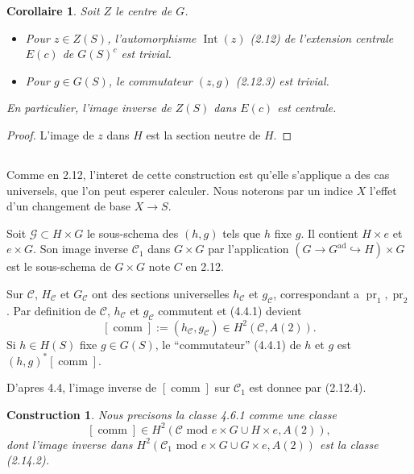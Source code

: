\documentclass[11pt,a4paper]{article}
\theoremstyle{plain}
\newtheorem{corollary}[theorem]{Corollaire}
\newtheorem{construction}[theorem]{Construction}
\theoremstyle{definition}
\DeclareMathOperator{\ad}{ad}
\DeclareMathOperator{\Int}{Int}
\DeclareMathOperator{\pr}{pr}
\DeclareMathOperator{\comm}{comm}
\begin{document}
\begin{corollary}\label{4.5}
Soit $Z$ le centre de $G$.
\begin{itemize}
\item[(i)] Pour $z \in Z(S)$, l'automorphisme $\Int(z)$ (2.12) de l'extension centrale $E(c)$ de $G(S)^c$ est trivial.
\item[(ii)] Pour $g \in G(S)$, le commutateur $(z, g)$ (2.12.3) est trivial.
\end{itemize}
En particulier, l'image inverse de $Z(S)$ dans $E(c)$ est centrale.
\end{corollary}

\begin{proof}
L'image de $z$ dans $H$ est la section neutre de $H$.
\end{proof}

\subsection{}\label{4.6}

Comme en 2.12, l'interet de cette construction est qu'elle s'applique a des cas universels, que l'on peut esperer calculer. Nous noterons par un indice $X$ l'effet d'un changement de base $X \to S$.

Soit $\mathscr{G} \subset H \times G$ le sous-schema des $(h, g)$ tels que $h$ fixe $g$. Il contient $H \times e$ et $e \times G$. Son image inverse $\mathscr{C}_1$ dans $G \times G$ par l'application $(G \to G^{\ad} \hookrightarrow H) \times G$ est le sous-schema de $G \times G$ note $C$ en 2.12.

Sur $\mathscr{C}$, $H_{\mathscr{C}}$ et $G_{\mathscr{C}}$ ont des sections universelles $h_{\mathscr{C}}$ et $g_{\mathscr{C}}$, correspondant a $\pr_1, \pr_2$. Par definition de $\mathscr{C}$, $h_{\mathscr{C}}$ et $g_{\mathscr{C}}$ commutent et (4.4.1) devient
\begin{equation}\label{4.6.1}
[\comm] := (h_{\mathscr{C}}, g_{\mathscr{C}}) \in H^2(\mathscr{C}, A(2)).
\end{equation}
Si $h \in H(S)$ fixe $g \in G(S)$, le ``commutateur'' (4.4.1) de $h$ et $g$ est $(h, g)^*[\comm]$.

D'apres 4.4, l'image inverse de $[\comm]$ sur $\mathscr{C}_1$ est donnee par (2.12.4).

\begin{construction}\label{4.7}
Nous precisons la classe 4.6.1 comme une classe
\[
[\comm] \in H^2(\mathscr{C} \text{ mod } e \times G \cup H \times e, A(2)),
\]
dont l'image inverse dans $H^2(\mathscr{C}_1 \text{ mod } e \times G \cup G \times e, A(2))$ est la classe (2.14.2).
\end{construction}
\end{document}
